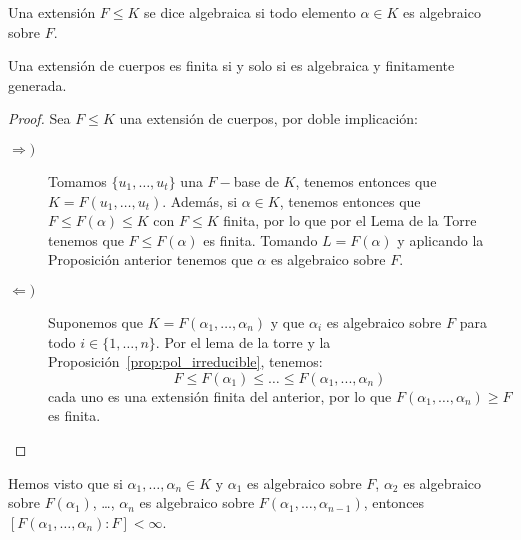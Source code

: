 \begin{definicion}
    Una extensión $F\leq K$ se dice algebraica si todo elemento $\alpha\in K$ es algebraico sobre $F$.
\end{definicion}

\begin{teo}\label{teo:finita_algebraica}
    Una extensión de cuerpos es finita si y solo si es algebraica y finitamente generada.
    \begin{proof}
        Sea $F\leq K$ una extensión de cuerpos, por doble implicación:
        \begin{description}
            \item [$\Longrightarrow )$] Tomamos $\{u_1, \ldots, u_t\}$ una $F-$base de $K$, tenemos entonces que $K = F(u_1, \ldots, u_t)$. Además, si $\alpha\in K$, tenemos entonces que $F\leq F(\alpha)\leq K$ con $F\leq K$ finita, por lo que por el Lema de la Torre tenemos que $F\leq F(\alpha)$ es finita. Tomando $L = F(\alpha)$ y aplicando la Proposición anterior tenemos que $\alpha$ es algebraico sobre $F$.
            \item [$\Longleftarrow )$] Suponemos que $K = F(\alpha_1, \ldots, \alpha_n)$ y que $\alpha_i$ es algebraico sobre $F$ para todo $i\in \{1,\ldots,n\}$. Por el lema de la torre y la Proposición~\ref{prop:pol_irreducible}, tenemos:
                \begin{equation*}
                    F\leq F(\alpha_1) \leq \ldots \leq F(\alpha_1, ..., \alpha_n) 
                \end{equation*}
                cada uno es una extensión finita del anterior, por lo que $F(\alpha_1, \ldots, \alpha_n)\geq F$ es finita.
        \end{description}
    \end{proof}
\end{teo}

\begin{observacion}
    Hemos visto que si $\alpha_1, \ldots, \alpha_n\in K$ y $\alpha_1$ es algebraico sobre $F$, $\alpha_2 $ es algebraico sobre $F(\alpha_1)$, \ldots, $\alpha_n$ es algebraico sobre $F(\alpha_1, \ldots, \alpha_{n-1})$, entonces $[F(\alpha_1, \ldots, \alpha_n) : F] < \infty$.
\end{observacion}

